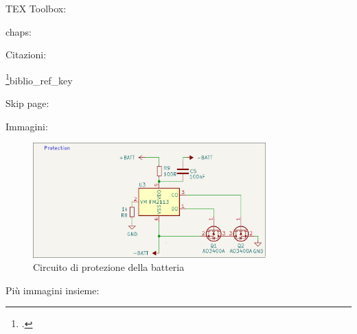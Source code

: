 TEX Toolbox: 

chaps:
\label{chap:intro}
\label{chap:firegex}
\label{chap:ctfad}
\label{chap:nfproxy}
\label{chap:tests}
\label{chap:notes}
\label{chap:ending}

Citazioni:

\cite{riscv}
\footcite{Small description}{biblio_ref_key}

Skip page:

\vspace{\fill}
\newpage

Immagini:

\begin{figure}[H]
  \centering
  \includegraphics[width=0.8\textwidth]{images/chapter2/protection.png}
  \caption{Circuito di protezione della batteria}\label{fig:protection}
\end{figure}

Più immagini insieme:

